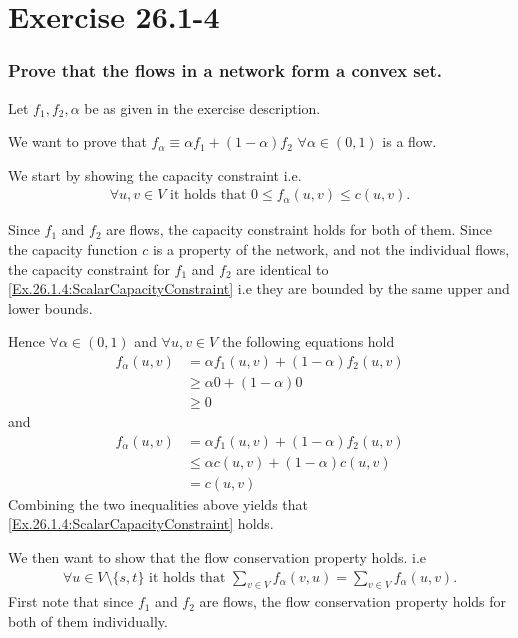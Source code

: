 \section*{Exercise 26.1-4}
\subsubsection*{Prove that the flows in a network form a convex set.}
Let $f_1,f_2,\alpha$ be as given in the exercise description.

We want to prove that $f_{\alpha}\equiv\alpha f_1 + (1- \alpha)f_2$ $\forall \alpha \in (0,1)$ is a flow.

We start by showing the capacity constraint i.e. 
\begin{align}
\forall u,v \in V \text{ it holds that } 0\leq f_{\alpha}(u,v)\leq c(u,v)\label{Ex.26.1.4:ScalarCapacityConstraint}.
\end{align}

Since $f_1$ and $f_2$ are flows, the capacity constraint holds for both of them. Since the capacity function $c$ is a property of the network, and not the individual flows, the capacity constraint for $f_1$ and $f_2$ are identical to \eqref{Ex.26.1.4:ScalarCapacityConstraint} i.e they are bounded by the same upper and lower bounds.

Hence $\forall \alpha \in (0,1)$ and $\forall u,v \in V$ the following equations hold
\begin{align*}
f_{\alpha}(u,v) &= \alpha f_1(u,v) + (1- \alpha)f_2(u,v)\\
                &\geq \alpha 0 + (1- \alpha)0 \\
								&\geq 0
\end{align*}
and
\begin{align*}
f_{\alpha}(u,v) &= \alpha f_1(u,v) + (1- \alpha)f_2(u,v)\\
                &\leq \alpha c(u,v) + (1- \alpha)c(u,v) \\
								&= c(u,v)
\end{align*}
Combining the two inequalities above yields that \eqref{Ex.26.1.4:ScalarCapacityConstraint} holds.

We then want to show that the flow conservation property holds. i.e
\begin{align}
\forall u \in V\setminus\{s,t\} \text{ it holds that } \sum_{v\in V}f_{\alpha}(v,u) = \sum_{v\in V}f_{\alpha}(u,v)\label{Ex.26.1.4:FlowConservationConstraint}.
\end{align}
First note that since $f_1$ and $f_2$ are flows, the flow conservation property holds for both of them individually.


